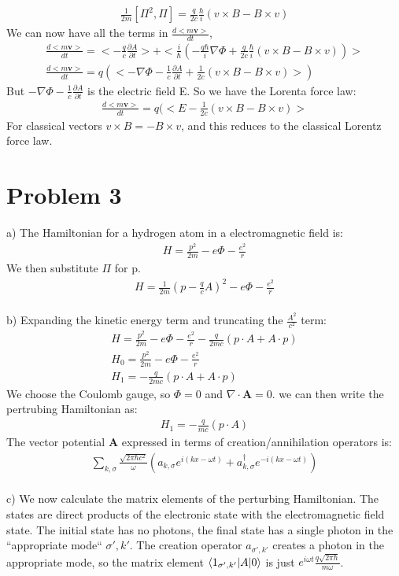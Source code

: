 \documentclass[a4paper,11pt]{article}
\numberwithin{equation}{section}
\newcommand{\bv}[1]{\mathbf{#1}}
\begin{document}
\begin{gather}
  \frac{1}{2m}[\Pi^2,\Pi]=\frac{q}{2c}\frac{\hbar}{i}(v \times B - B \times v)
\end{gather}
We can now have all the terms in $\frac{d<m\bv{v}>}{dt}$,
\begin{gather}
 \frac{d<m\bv{v}>}{dt}=<-\frac{q}{c}\frac{\partial A}{\partial t}>+<\frac{i}{\hbar}\left( 
	-\frac{q \hbar}{i}\nabla\Phi+\frac{q}{2c}\frac{\hbar}{i}(v \times B - B \times v)   \right)>\\
 \frac{d<m\bv{v}>}{dt}=q(<-\nabla\Phi-\frac{1}{c}\frac{\partial A}{\partial t}+\frac{1}{2c}(v \times B - B \times v) >)	
\end{gather}
But $-\nabla\Phi-\frac{1}{c}\frac{\partial A}{\partial t}$ is the electric field E. 
So we have the Lorenta force law:
\begin{gather}
 \frac{d<m\bv{v}>}{dt}=q(<E-\frac{1}{2c}(v \times B - B \times v) >	
\end{gather}
For classical vectors $v\times B = -B \times v$, and this reduces to the classical Lorentz force law.


\section{Problem 3}
a) The Hamiltonian for a hydrogen atom in a electromagnetic field is:
\begin{gather}
 H=\frac{p^2}{2m}-e\Phi-\frac{e^2}{r}
\end{gather}
We then substitute $\Pi$ for p.
\begin{gather}
 H=\frac{1}{2m}\left(p-\frac{q}{c}A \right)^2-e\Phi-\frac{e^2}{r}
\end{gather}
\\
b) Expanding the kinetic energy term and truncating the $\frac{A^2}{c^2}$ term:
\begin{gather}
 H=\frac{p^2}{2m}-e\Phi-\frac{e^2}{r}-\frac{q}{2mc}\left(p\cdot A+A\cdot p \right)\\
 H_0 = \frac{p^2}{2m}-e\Phi-\frac{e^2}{r}\\
 H_1=-\frac{q}{2mc}\left(p\cdot A+A\cdot p \right)
\end{gather}
We choose the Coulomb gauge, so $\Phi=0$ and $\nabla \cdot \bv{A}=0$.
we can then write the pertrubing Hamiltonian as:
\begin{gather}
 H_1=-\frac{q}{mc}\left(p\cdot A\right)
\end{gather}
The vector potential $\bv{A}$ expressed in terms of creation/annihilation operators is:
\begin{gather}
 \sum_{k,\sigma}\frac{\sqrt{2\pi\hbar c^2}}{\omega}\left(a_{k,\sigma}e^{i(kx-\omega t)}
      +a_{k,\sigma}^{\dagger} e^{-i(kx-\omega t)} \right)
\end{gather}
\\
c) We now calculate the matrix elements of the perturbing Hamiltonian.
The states are direct products of the electronic state with the electromagnetic field state. 
The initial state has no photons, the final state has a single photon in the ``appropriate mode`` $\sigma',k'$.
The creation operator $a_{\sigma ', k'}$ creates a photon in the appropriate mode, so the matrix element $\braket{1_{\sigma',k'}|A|0}$ is just $e^{i\omega t}\frac{q\sqrt{2\pi\hbar}}{m \omega}$.
\end{document}
